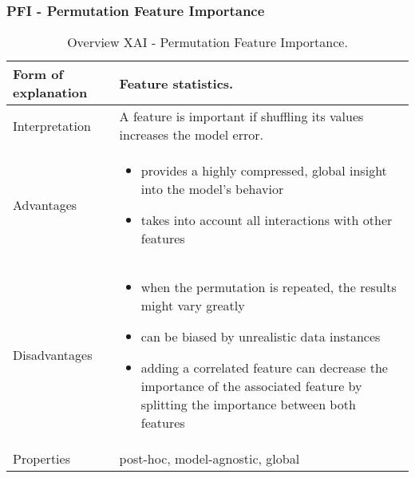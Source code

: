 \subsubsection{PFI - Permutation Feature Importance}
\begin{table}[H]
  \centering
  \begin{tabular}{|p{}|p{}|}
    \hline
    Form of \newline explanation & 
    Feature statistics. \\
    
    \hline
    Interpretation & 
    A feature is important if shuffling its values increases the model error. \\
    \hline
    Advantages &
    \begin{itemize}[nosep, left=0em]
        \item provides a highly compressed, global insight into the model’s behavior
        \item takes into account all interactions with other features
    \end{itemize} \\
    
    \hline
    Disadvantages &
    \begin{itemize}[nosep, left=0em]
        \item when the permutation is repeated, the results might vary greatly
        \item can be biased by unrealistic data instances
        \item adding a correlated feature can decrease the importance of the associated feature by splitting the importance between both features
    \end{itemize} \\
    
    \hline
    Properties & 
    post-hoc, model-agnostic, global  \\
    
    \hline
  \end{tabular}
  \caption{Overview XAI - Permutation Feature Importance.}
\end{table}


